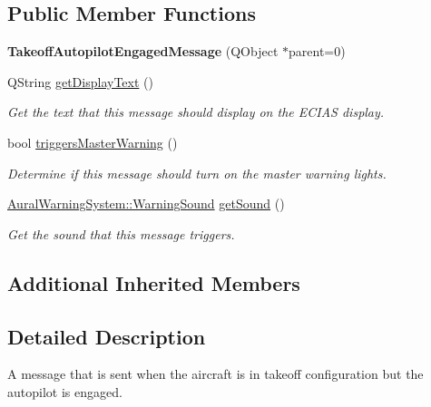 \subsection*{Public Member Functions}
\begin{DoxyCompactItemize}
\item 
\hypertarget{class_challenger604_systems_1_1_c_a_s_1_1_takeoff_autopilot_engaged_message_a5bce5d16603ce23b659a8b34d394b615}{{\bfseries Takeoff\-Autopilot\-Engaged\-Message} (Q\-Object $\ast$parent=0)}\label{class_challenger604_systems_1_1_c_a_s_1_1_takeoff_autopilot_engaged_message_a5bce5d16603ce23b659a8b34d394b615}

\item 
Q\-String \hyperlink{class_challenger604_systems_1_1_c_a_s_1_1_takeoff_autopilot_engaged_message_acb892ffef0a7e4e74c647db696ea44c7}{get\-Display\-Text} ()
\begin{DoxyCompactList}\small\item\em Get the text that this message should display on the E\-C\-I\-A\-S display. \end{DoxyCompactList}\item 
bool \hyperlink{class_challenger604_systems_1_1_c_a_s_1_1_takeoff_autopilot_engaged_message_a6c6c7b355cfd49db0f3090ce00f5b222}{triggers\-Master\-Warning} ()
\begin{DoxyCompactList}\small\item\em Determine if this message should turn on the master warning lights. \end{DoxyCompactList}\item 
\hyperlink{class_challenger604_systems_1_1_aural_warning_system_a06a8a8fa973dde5ad449b8e0ca058a26}{Aural\-Warning\-System\-::\-Warning\-Sound} \hyperlink{class_challenger604_systems_1_1_c_a_s_1_1_takeoff_autopilot_engaged_message_a0f3b9be1d9ee8665b5fe6179f666766f}{get\-Sound} ()
\begin{DoxyCompactList}\small\item\em Get the sound that this message triggers. \end{DoxyCompactList}\end{DoxyCompactItemize}
\subsection*{Additional Inherited Members}


\subsection{Detailed Description}
A message that is sent when the aircraft is in takeoff configuration but the autopilot is engaged. 

